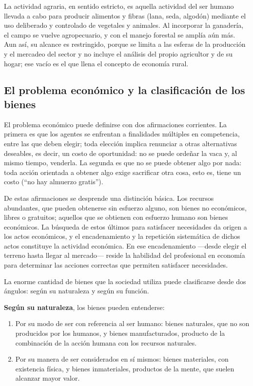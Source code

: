 \documentclass[
  man,
  floatsintext,
  longtable,
  a4paper,
  nolmodern,
  notxfonts,
  notimes,
  12pt,
  colorlinks=true,linkcolor=blue,citecolor=blue,urlcolor=blue]{apa7}
\begin{document}
La actividad agraria, en sentido estricto, es aquella actividad del ser
humano llevada a cabo para producir alimentos y fibras (lana, seda,
algodón) mediante el uso deliberado y controlado de vegetales y
animales. Al incorporar la ganadería, el campo se vuelve agropecuario, y
con el manejo forestal se amplía aún más. Aun así, su alcance es
restringido, porque se limita a las esferas de la producción y el
mercadeo del sector y no incluye el análisis del propio agricultor y de
su hogar; ese vacío es el que llena el concepto de economía rural.

\subsection{El problema económico y la clasificación de los
bienes}\label{el-problema-econuxf3mico-y-la-clasificaciuxf3n-de-los-bienes}

El problema económico puede definirse con dos afirmaciones corrientes.
La primera es que los agentes se enfrentan a finalidades múltiples en
competencia, entre las que deben elegir; toda elección implica renunciar
a otras alternativas deseables, es decir, un costo de oportunidad: no se
puede ordeñar la vaca y, al mismo tiempo, venderla. La segunda es que no
se puede obtener algo por nada: toda acción orientada a obtener algo
exige sacrificar otra cosa, esto es, tiene un costo (``no hay almuerzo
gratis'').

De estas afirmaciones se desprende una distinción básica. Los recursos
abundantes, que pueden obtenerse sin esfuerzo alguno, son bienes no
económicos, libres o gratuitos; aquellos que se obtienen con esfuerzo
humano son bienes económicos. La búsqueda de estos últimos para
satisfacer necesidades da origen a los actos económicos, y el
encadenamiento y la repetición sistemática de dichos actos constituye la
actividad económica. En ese encadenamiento ---desde elegir el terreno
hasta llegar al mercado--- reside la habilidad del profesional en
economía para determinar las acciones correctas que permiten satisfacer
necesidades.

La enorme cantidad de bienes que la sociedad utiliza puede clasificarse
desde dos ángulos: según su naturaleza y según su función.

\textbf{Según su naturaleza}, los bienes pueden entenderse:

\begin{enumerate}
\def\labelenumi{\arabic{enumi}.}
\item
  Por su modo de ser con referencia al ser humano: bienes naturales, que
  no son producidos por los humanos, y bienes manufacturados, producto
  de la combinación de la acción humana con los recursos naturales.
\item
  Por su manera de ser considerados en sí mismos: bienes materiales, con
  existencia física, y bienes inmateriales, productos de la mente, que
  suelen alcanzar mayor valor.
\end{enumerate}
\end{document}
